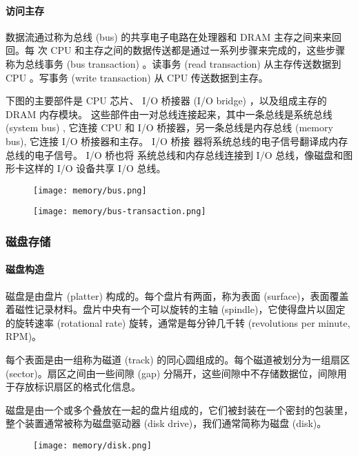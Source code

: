 \paragraph{访问主存}
数据流通过称为总线 (bus) 的共享电子电路在处理器和 DRAM 主存之间来来回回。每
次 CPU 和主存之间的数据传送都是通过一系列步骤来完成的，这些步骤称为总线事务
(bus transaction) 。读事务 (read transaction) 从主存传送数据到 CPU 。写事务 (write transaction) 从 CPU 传送数据到主存。

下图的主要部件是 CPU 芯片、 I/O
桥接器 (I/O bridge) ，以及组成主存的 DRAM 内存模块。
这些部件由一对总线连接起来，其中一条总线是系统总线 (system bus) , 它连接 CPU 和
I/O 桥接器，另一条总线是内存总线 (memory bus), 它连接 I/O 桥接器和主存。 I/O 桥接
器将系统总线的电子信号翻译成内存总线的电子信号。 I/O 桥也将
系统总线和内存总线连接到 I/O 总线，像磁盘和图形卡这样的 I/O 设备共享 I/O 总线。

\begin{figure}[H]
    \centering
    \texttt{[image: memory/bus.png]}
\end{figure}
\begin{figure}[H]
    \centering
    \texttt{[image: memory/bus-transaction.png]}
\end{figure}

\subsubsection{磁盘存储}
\paragraph{磁盘构造}
磁盘是由盘片 (platter) 构成的。每个盘片有两面，称为表面 (surface)，表面覆盖着磁性记录材料。盘片中央有一个可以旋转的主轴 (spindle)，它使得盘片以固定的旋转速率 (rotational rate) 旋转，通常是每分钟几千转 (revolutions per minute, RPM)。

每个表面是由一组称为磁道 (track) 的同心圆组成的。每个磁道被划分为一组扇区 (sector)。扇区之间由一些间隙 (gap) 分隔开，这些间隙中不存储数据位，间隙用于存放标识扇区的格式化信息。

磁盘是由一个或多个叠放在一起的盘片组成的，它们被封装在一个密封的包装里，整个装置通常被称为磁盘驱动器 (disk drive)，我们通常简称为磁盘 (disk)。

\begin{figure}[H]
    \centering
    \texttt{[image: memory/disk.png]}
\end{figure}

